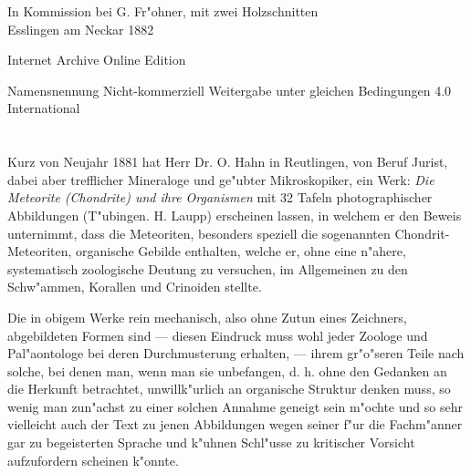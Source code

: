 \documentclass[a4paper, 11pt, oneside]{article}
\begin{document}
\begin{titlepage}
	\vspace*{1\baselineskip} %
	
    {\normalsize In Kommission bei G. Fr"ohner, mit zwei Holzschnitten\\ Esslingen am Neckar 1882} %
    
    \vspace*{\fill}

	{\small\scshape }

    Internet Archive Online Edition  %
	
	{\small Namensnennung Nicht-kommerziell Weitergabe unter gleichen Bedingungen 4.0 International} %
\end{titlepage}
\setlength{\parskip}{1mm plus1mm minus1mm}
\clearpage
\tableofcontents
\clearpage
\LARGE
\pagestyle{fancy}
\fancyhf{}
\cfoot{\frakfamily{\thepage}}
\section*{}
\paragraph{}
Kurz von Neujahr 1881 hat Herr Dr. O. Hahn in Reutlingen, von Beruf Jurist, dabei aber trefflicher Mineraloge und ge"ubter Mikroskopiker, ein Werk: \emph{Die Meteorite (Chondrite) und ihre Organismen} mit 32 Tafeln photographischer Abbildungen (T"ubingen. H. Laupp) erscheinen lassen, in welchem er den Beweis unternimmt, dass die Meteoriten, besonders speziell die sogenannten Chondrit-Meteoriten, organische Gebilde enthalten, welche er, ohne eine n"ahere, systematisch zoologische Deutung zu versuchen, im Allgemeinen zu den Schw"ammen, Korallen und Crinoiden stellte.

Die in obigem Werke rein mechanisch, also ohne Zutun eines Zeichners, abgebildeten Formen sind --- diesen Eindruck muss wohl jeder Zoologe und Pal"aontologe bei deren Durchmusterung erhalten, --- ihrem gr"o"seren Teile nach solche, bei denen man, wenn man sie unbefangen, d. h. ohne den Gedanken an die Herkunft betrachtet, unwillk"urlich an organische Struktur denken muss, so wenig man zun"achst zu einer solchen Annahme geneigt sein m"ochte und so sehr vielleicht auch der Text zu jenen Abbildungen wegen seiner f"ur die Fachm"anner gar zu begeisterten Sprache und k"uhnen Schl"usse zu kritischer Vorsicht aufzufordern scheinen k"onnte.
\end{document}
